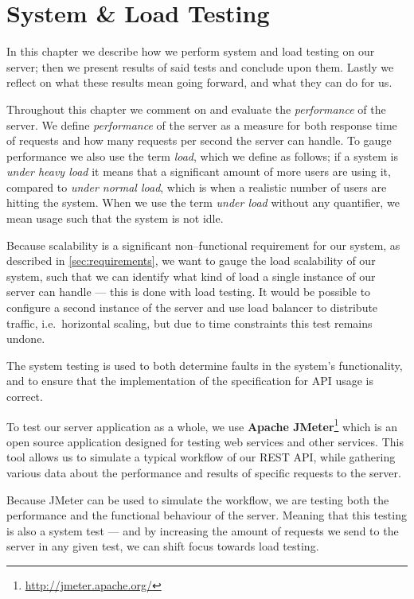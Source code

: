 \chapter{System \& Load Testing}\label{cha:system_and_load_testing}
In this chapter we describe how we perform system and load testing on our server;
then we present results of said tests and conclude upon them.
Lastly we reflect on what these results mean going forward, and what they can do for us.

Throughout this chapter we comment on and evaluate the \textit{performance} of the server.
We define \textit{performance} of the server as a measure for both response time of requests and how many requests per second the server can handle.
To gauge performance we also use the term \textit{load}, which we define as follows;
if a system is \textit{under heavy load} it means that a significant amount of more users are using it, compared to \textit{under normal load}, which is when a realistic number of users are hitting the system.
When we use the term \textit{under load} without any quantifier, we mean usage such that the system is not idle.

\bigskip
Because scalability is a significant non--functional requirement for our system, as described in \cref{sec:requirements}, we want to gauge the load scalability of our system, such that we can identify what kind of load a single instance of our server can handle --- this is done with load testing. %
It would be possible to configure a second instance of the server and use load balancer to distribute traffic, i.e.~horizontal scaling, but due to time constraints this test remains undone.

The system testing is used to both determine faults in the system's functionality, and to ensure that the implementation of the specification for API usage is correct.

\bigskip
To test our server application as a whole, we use \textbf{Apache JMeter}\footnote{\url{http://jmeter.apache.org/}} which is an open source application designed for testing web services and other services.
This tool allows us to simulate a typical workflow of our REST API, while gathering various data about the performance and results of specific requests to the server.

Because JMeter can be used to simulate the workflow, we are testing both the performance and the functional behaviour of the server.
Meaning that this testing is also a system test --- and by increasing the amount of requests we send to the server in any given test, we can shift focus towards load testing.

